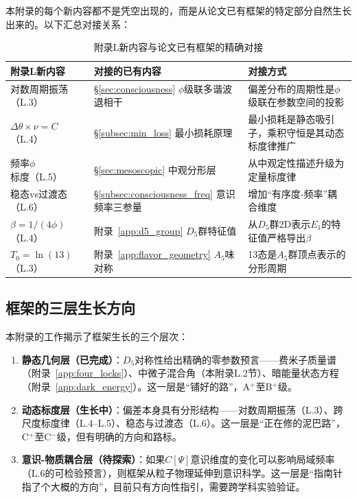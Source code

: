 本附录的每个新内容都不是凭空出现的，而是从论文已有框架的特定部分自然生长出来的。以下汇总对接关系：

\begin{table}[htbp]
\centering
\caption{附录L新内容与论文已有框架的精确对接}
\label{tab:docking_points}
\begin{tabular}{llp{6cm}}
\hline
附录L新内容 & 对接的已有内容 & 对接方式 \\
\hline
对数周期振荡（L.3） & \S\ref{sec:consciousness} $\phi$级联多谐波退相干 & 偏差分布的周期性是$\phi$级联在参数空间的投影 \\
$\Delta\theta \times \nu = C$（L.4） & \S\ref{subsec:min_loss} 最小损耗原理 & 最小损耗是静态吸引子，乘积守恒是其动态标度律推广 \\
频率$\phi$标度（L.5） & \S\ref{sec:mesoscopic} 中观分形层 & 从中观定性描述升级为定量标度律 \\
稳态vs过渡态（L.6） & \S\ref{subsec:consciousness_freq} 意识频率三参量 & 增加``有序度-频率''耦合维度 \\
$\beta = 1/(4\phi)$（L.4） & 附录~\ref{app:d5_group} $D_5$群特征值 & 从$D_5$群2D表示$E_1$的特征值严格导出$\beta$ \\
$T_0 = \ln(13)$（L.3） & 附录~\ref{app:flavor_geometry} $A_5$味对称 & 13态是$A_5$群顶点表示的分形周期 \\
\hline
\end{tabular}
\end{table}

\subsection{框架的三层生长方向}
\label{subsec:three_layers}

本附录的工作揭示了框架生长的三个层次：

\begin{enumerate}
\item \textbf{静态几何层（已完成）}：$D_5$对称性给出精确的零参数预言——费米子质量谱（附录~\ref{app:four_locks}）、中微子混合角（本附录L.2节）、暗能量状态方程（附录~\ref{app:dark_energy}）。这一层是``铺好的路''，A$^+$至B$^+$级。

\item \textbf{动态标度层（生长中）}：偏差本身具有分形结构——对数周期振荡（L.3）、跨尺度标度律（L.4--L.5）、稳态与过渡态（L.6）。这一层是``正在修的泥巴路''，C$^+$至C$^-$级，但有明确的方向和路标。

\item \textbf{意识-物质耦合层（待探索）}：如果$C[\Psi]$意识维度的变化可以影响局域频率（L.6的可检验预言），则框架从粒子物理延伸到意识科学。这一层是``指南针指了个大概的方向''，目前只有方向性指引，需要跨学科实验验证。
\end{enumerate}


